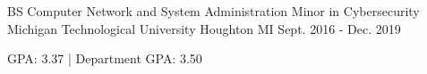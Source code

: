 

\begin{cventries}

  \cventry
    {BS Computer Network and System Administration Minor in Cybersecurity} %
    {Michigan Technological University} %
    {Houghton MI} %
    {Sept. 2016 - Dec. 2019} %
    {
      \begin{cvitems} %
        \item {GPA: 3.37  |  Department GPA: 3.50}
      \end{cvitems}
    }

\end{cventries}
